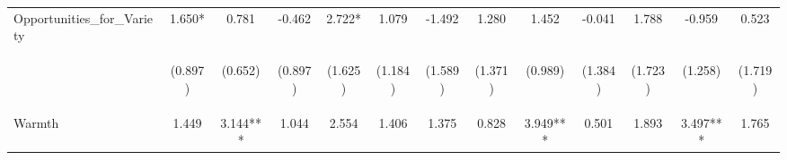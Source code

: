 \begin{tabular}{lcccccccccccc}
\noalign{\smallskip}Opportunities_for_Variety & 1.650* & 0.781 & -0.462 & 2.722* & 1.079 & -1.492 & 1.280 & 1.452 & -0.041 & 1.788 & -0.959 & 0.523\\
 & \begin{footnotesize}(0.897)\end{footnotesize} & \begin{footnotesize}(0.652)\end{footnotesize} & \begin{footnotesize}(0.897)\end{footnotesize} & \begin{footnotesize}(1.625)\end{footnotesize} & \begin{footnotesize}(1.184)\end{footnotesize} & \begin{footnotesize}(1.589)\end{footnotesize} & \begin{footnotesize}(1.371)\end{footnotesize} & \begin{footnotesize}(0.989)\end{footnotesize} & \begin{footnotesize}(1.384)\end{footnotesize} & \begin{footnotesize}(1.723)\end{footnotesize} & \begin{footnotesize}(1.258)\end{footnotesize} & \begin{footnotesize}(1.719)\end{footnotesize}\\
\noalign{\smallskip}Warmth & 1.449 & 3.144*** & 1.044 & 2.554 & 1.406 & 1.375 & 0.828 & 3.949*** & 0.501 & 1.893 & 3.497*** & 1.765\\

\end{tabular}
